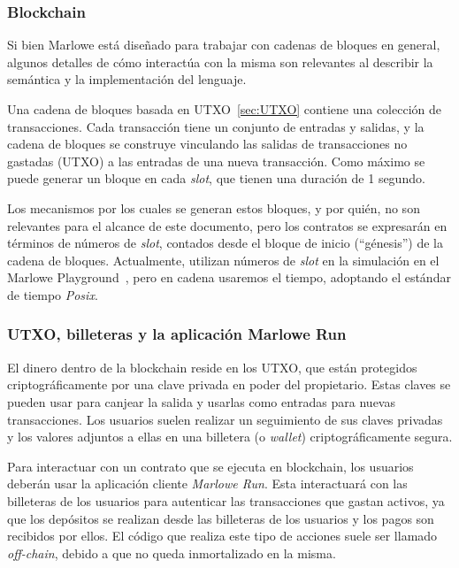 \documentclass[12pt]{book}
\begin{document}
\subsubsection{Blockchain}

Si bien Marlowe está diseñado para trabajar con cadenas de bloques en general, algunos detalles de cómo interactúa con la misma son relevantes al describir la semántica y la implementación del lenguaje.

Una cadena de bloques basada en UTXO~\ref{sec:UTXO} contiene una colección de transacciones. Cada transacción tiene un conjunto de entradas y salidas, y la cadena de bloques se construye vinculando las salidas de transacciones no gastadas (UTXO) a las entradas de una nueva transacción. Como máximo se puede generar un bloque en cada \textit{slot}, que tienen una duración de 1 segundo.

Los mecanismos por los cuales se generan estos bloques, y por quién, no son relevantes para el alcance de este documento, pero los contratos se expresarán en términos de números de \textit{slot}, contados desde el bloque de inicio (``génesis'') de la cadena de bloques. Actualmente, utilizan números de \textit{slot} en la simulación en el Marlowe Playground~\cite{marlowe_playground}, pero en cadena usaremos el tiempo, adoptando el estándar de tiempo \textit{Posix}.

\subsubsection{UTXO, billeteras y la aplicación Marlowe Run}
El dinero dentro de la blockchain reside en los UTXO, que están protegidos criptográficamente por una clave privada en poder del propietario. Estas claves se pueden usar para canjear la salida y usarlas como entradas para nuevas transacciones. Los usuarios suelen realizar un seguimiento de sus claves privadas y los valores adjuntos a ellas en una billetera (o \textit{wallet}) criptográficamente segura.

Para interactuar con un contrato que se ejecuta en blockchain, los usuarios deberán usar la aplicación cliente \textit{Marlowe Run}. Esta interactuará con las billeteras de los usuarios para autenticar las transacciones que gastan activos, ya que los depósitos se realizan desde las billeteras de los usuarios y los pagos son recibidos por ellos. El código que realiza este tipo de acciones suele ser llamado \textit{off-chain}, debido a que no queda inmortalizado en la misma.
\end{document}
